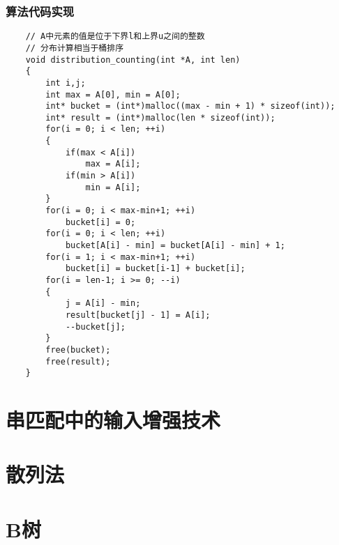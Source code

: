 \documentclass[a4paper,left=2.5cm,right=2.5cm,11pt]{article}
\begin{document}
\subsubsection{算法代码实现}
	\begin{lstlisting}
	// A中元素的值是位于下界l和上界u之间的整数
	// 分布计算相当于桶排序
	void distribution_counting(int *A, int len)
	{
		int i,j;
		int max = A[0], min = A[0];
		int* bucket = (int*)malloc((max - min + 1) * sizeof(int));
		int* result = (int*)malloc(len * sizeof(int));
		for(i = 0; i < len; ++i)
		{
			if(max < A[i])
				max = A[i];
			if(min > A[i])
				min = A[i];
		}
		for(i = 0; i < max-min+1; ++i)
			bucket[i] = 0;
		for(i = 0; i < len; ++i)
			bucket[A[i] - min] = bucket[A[i] - min] + 1;
		for(i = 1; i < max-min+1; ++i)
			bucket[i] = bucket[i-1] + bucket[i];
		for(i = len-1; i >= 0; --i)
		{
			j = A[i] - min;
			result[bucket[j] - 1] = A[i];
			--bucket[j];
		}
		free(bucket);
		free(result);
	}
	\end{lstlisting}

\section{串匹配中的输入增强技术}
\section{散列法}
\section{B树}
\end{document}
